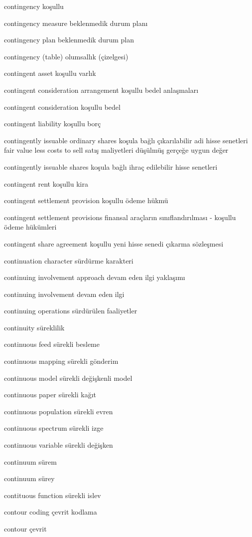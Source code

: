 \documentclass[12pt,fleqn]{article}\usepackage{../../common}
\begin{document}
contingency koşullu

contingency measure beklenmedik durum planı

contingency plan beklenmedik durum plan

contingency (table) olumsallık (çizelgesi)

contingent asset koşullu varlık

contingent consideration arrangement koşullu bedel anlaşmaları

contingent consideration koşullu bedel

contingent liability koşullu borç

contingently issuable ordinary shares koşula bağlı çıkarılabilir adi hisse senetleri fair value less costs to sell satış maliyetleri düşülmüş gerçeğe uygun değer

contingently issuable shares koşula bağlı ihraç edilebilir hisse senetleri

contingent rent koşullu kira

contingent settlement provision koşullu ödeme hükmü

contingent settlement provisions finansal araçların sınıflandırılması - koşullu ödeme hükümleri

contingent share agreement koşullu yeni hisse senedi çıkarma sözleşmesi

continuation character sürdürme karakteri

continuing involvement approach devam eden ilgi yaklaşımı

continuing involvement devam eden ilgi

continuing operations sürdürülen faaliyetler

continuity süreklilik

continuous feed sürekli besleme

continuous mapping sürekli gönderim

continuous model sürekli değişkenli model

continuous paper sürekli kağıt

continuous population sürekli evren

continuous spectrum sürekli izge

continuous variable sürekli değişken

continuum sürem

continuum sürey

contituous function sürekli islev

contour coding çevrit kodlama

contour çevrit
\end{document}
